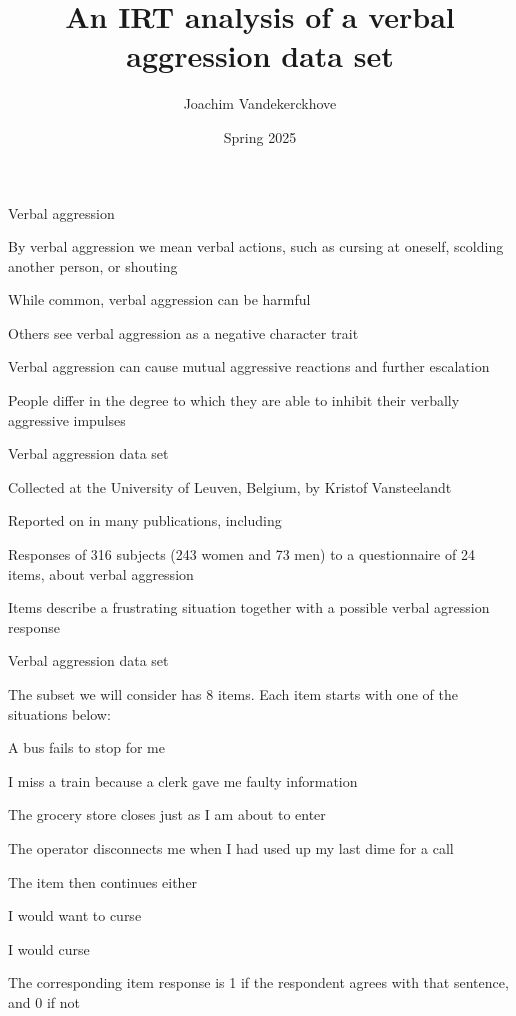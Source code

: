 \documentclass[aspectratio=169]{beamer}
\author{Joachim Vandekerckhove}
\date{Spring 2025}
\title{An IRT analysis of a verbal aggression data set}
\begin{document}
\maketitle

\begin{frame}[fragile]{Verbal aggression}

By verbal aggression we mean verbal actions, such as cursing at oneself, scolding another person, or shouting\pause

While common, verbal aggression can be harmful\pause

Others see verbal aggression as a negative character trait\pause

Verbal aggression can cause mutual aggressive reactions and further escalation\pause

People differ in the degree to which they are able to inhibit their verbally aggressive impulses

\end{frame}


\begin{frame}[fragile]{Verbal aggression data set}

Collected at the University of Leuven, Belgium, by Kristof Vansteelandt\pause

Reported on in many publications, including \pause

Responses of 316 subjects (243 women and 73 men) to a questionnaire of 24 items, about verbal aggression\pause

Items describe a frustrating situation together with a possible verbal agression response

\end{frame}


\begin{frame}[fragile]{Verbal aggression data set}

The subset we will consider has 8 items.  Each item starts with one of the situations below:\\[2ex]

\bi \small\it
\item A bus fails to stop for me
\item I miss a train because a clerk gave me faulty information
\item The grocery store closes just as I am about to enter
\item The operator disconnects me when I had used up my last dime for a call
\ei\pause

\normalsize The item then continues either
\bi\small\it
\item I would want to curse
\item I would curse
\ei\pause

\normalsize
The corresponding item response is 1 if the respondent agrees with that sentence, and 0 if not

\end{frame}
\end{document}
